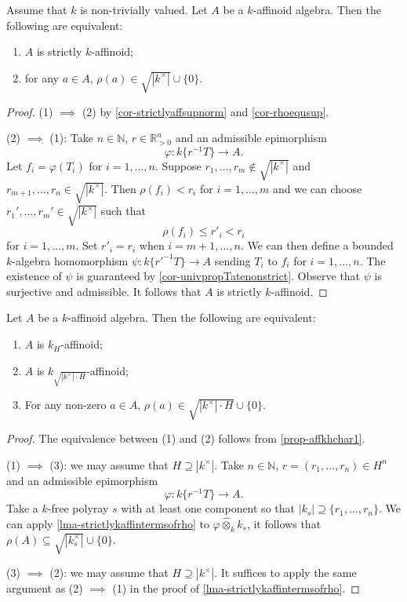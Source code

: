\begin{lemma}\label{lma-strictlykaffintermsofrho}
    Assume that $k$ is non-trivially valued.
    Let $A$ be a $k$-affinoid algebra. Then the following are equivalent:
    \begin{enumerate}
        \item $A$ is strictly $k$-affinoid;
        \item for any $a\in A$, $\rho(a)\in \sqrt{|k^{\times}|}\cup\{0\}$.
    \end{enumerate}
\end{lemma}
\begin{proof}
    (1) $\implies$ (2) by \cref{cor-strictlyaffsupnorm} and \cref{cor-rhoequsup}.

    (2) $\implies$ (1): Take $n\in \mathbb{N}$, $r\in \mathbb{R}^n_{>0}$ and  an admissible epimorphism 
    \[
        \varphi:k\{r^{-1}T\}\rightarrow A.  
    \]
    Let $f_i=\varphi(T_i)$ for $i=1,\ldots,n$. Suppose $r_1,\ldots,r_m\not\in \sqrt{|k^{\times}|}$ and $r_{m+1},\ldots,r_n\in \sqrt{|k^{\times}|}$. Then $\rho(f_i)<r_i$ for $i=1,\ldots,m$ and we can choose $r_1',\ldots,r_m'\in \sqrt{|k^{\times}|}$ such that 
    \[
        \rho(f_i)\leq r'_i<r_i
    \]
    for $i=1,\ldots,m$. Set $r'_i=r_i$ when $i=m+1,\ldots,n$. We can then define a bounded $k$-algebra homomorphism $\psi:k\{r'^{-1}T\}\rightarrow A$ sending $T_i$ to $f_i$ for $i=1,\ldots,n$. The existence of $\psi$ is guaranteed by \cref{cor-univpropTatenonstrict}. Observe that $\psi$ is surjective and admissible. It follows that $A$ is strictly $k$-affinoid.
\end{proof}

\begin{thm}\label{thm-strictaffdfnequal}
    Let $A$ be a $k$-affinoid algebra. Then the following are equivalent:
    \begin{enumerate}
        \item $A$ is $k_H$-affinoid;
        \item $A$ is $k_{\sqrt{|k^{\times}|\cdot H}}$-affinoid;
        \item For any non-zero $a\in A$, $\rho(a)\in \sqrt{|k^{\times}|\cdot H}\cup\{0\}$.
    \end{enumerate}
\end{thm}
\begin{proof}
    The equivalence between (1) and (2) follows from \cref{prop-affkhchar1}.

    (1) $\implies$ (3): we may assume that $H\supseteq |k^{\times}|$. Take $n\in \mathbb{N}$, $r=(r_1,\ldots,r_n)\in H^n$ and an admissible epimorphism 
    \[
        \varphi:k\{r^{-1}T\} \rightarrow A. 
    \]
    Take a $k$-free polyray $s$ with at least one component so that $|k_s|\supseteq \{r_1,\ldots,r_n\}$. We can apply \cref{lma-strictlykaffintermsofrho} to $\varphi\hat{\otimes}_k k_s$, it follows that $\rho(A)\subseteq \sqrt{|k_s^{\times}|}\cup \{0\}$.

    (3) $\implies$ (2): we may assume that $H\supseteq |k^{\times}|$. It suffices to apply the same argument as (2) $\implies$ (1) in the proof of \cref{lma-strictlykaffintermsofrho}.

\end{proof}


